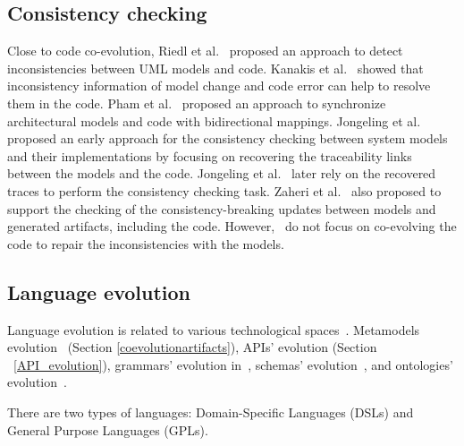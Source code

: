  \subsection{Consistency checking }
 \label{Consistency_checking}
  Close to code co-evolution, Riedl et al.~\cite{riedl2014towards} proposed an approach to detect inconsistencies between UML models and code. Kanakis et al.~\cite{kanakis2019empirical} showed that inconsistency information of model change and code error can help to resolve them in the code.%
 Pham et al.~\cite{pham2017bidirectional} proposed an approach to synchronize architectural models and code with bidirectional mappings.
 Jongeling et al.~\cite{jongeling2020towards} proposed an early approach for the consistency checking between system models and their implementations by focusing on recovering the traceability links between the models and the code. Jongeling et al.~\cite{jongeling2022Structural} later rely on the recovered traces to perform the consistency checking task.  %
 Zaheri et al.~\cite{zaheri2021towards} also proposed to support the checking of the consistency-breaking updates between models and generated artifacts, including the code. However,~\cite{pham2017bidirectional,jongeling2020towards,jongeling2022Structural,zaheri2021towards} do not focus on co-evolving the code to repair the inconsistencies with the models. 
 \subsection{Language evolution}
 
Language evolution is related to  various technological spaces~\cite{ivanov2002technological}. Metamodels evolution~\cite{favre2003meta} (Section \ref{coevolutionartifacts}), APIs' evolution \cite{dig2006apis} (Section ~\ref{API_evolution}), grammars' evolution in~\cite{5279907}, schemas' evolution~\cite{lammel2001format,meyer1996schema}, and ontologies' evolution~\cite{flouris2008ontology}.
  
   There are two types of languages: Domain-Specific Languages (DSLs) and General Purpose Languages (GPLs). 
   
